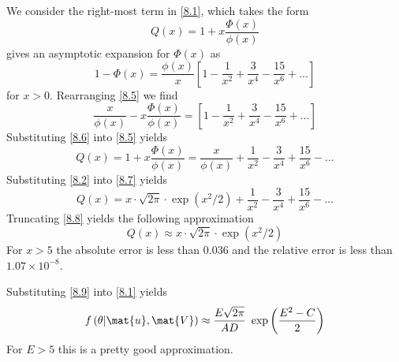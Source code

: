 \documentclass[12pt]{article}
\begin{document}
We consider the right-most term in \eqref{8.1}, which takes the form
%
\begin{equation}\label{8.4}
    Q(x) = 1 + x \frac{\Phi(x)}{\phi(x)}
\end{equation}
%
\citet[(26.2.12)]{Abramowitz65} gives an asymptotic expansion for $\Phi(x)$ as
%
\begin{equation}\label{8.5}
    1 - \Phi(x) = \frac{\phi(x)}{x} \left[ 1 - \frac{1}{x^2} + \frac{3}{x^4} - \frac{15}{x^6} + \ldots \right]
\end{equation}
%
for $x > 0$. Rearranging \eqref{8.5} we find
%
\begin{equation}\label{8.6}
     \frac{x}{\phi(x)} - x \frac{\Phi(x)}{\phi(x)} = \left[ 1 - \frac{1}{x^2} + \frac{3}{x^4} - \frac{15}{x^6} + \ldots \right]
\end{equation}
%
Substituting \eqref{8.6} into \eqref{8.5} yields
%
\begin{equation}\label{8.7}
     Q(x) = 1 + x \frac{\Phi(x)}{\phi(x)} = \frac{x}{\phi(x)} + \frac{1}{x^2} - \frac{3}{x^4} + \frac{15}{x^6} - \ldots
\end{equation}
%
Substituting \eqref{8.2} into \eqref{8.7} yields
%
\begin{equation}\label{8.8}
     Q(x) = x \cdot \sqrt{2\pi} \cdot \exp{(x^2/2)} + \frac{1}{x^2} - \frac{3}{x^4} + \frac{15}{x^6} - \ldots
\end{equation}
%
Truncating \eqref{8.8} yields the following approximation
%
\begin{equation}\label{8.9}
     Q(x) \approx x \cdot \sqrt{2\pi} \cdot \exp{(x^2/2)}
\end{equation}
%
For $x > 5$ the absolute error is less than $0.036$ and the relative error is less than $1.07 \times 10^{-8}$.

Substituting \eqref{8.9} into \eqref{8.1} yields
%
\begin{equation}\label{8.10}
    f\left( \theta | \mat{u}, \mat{V} \right)
    \approx \frac{E\sqrt{2\pi}}{AD} ~ \exp{\left(\frac{E^2 - C}{2}\right)}
\end{equation}
%
For $E > 5$ this is a pretty good approximation.



\end{document}
